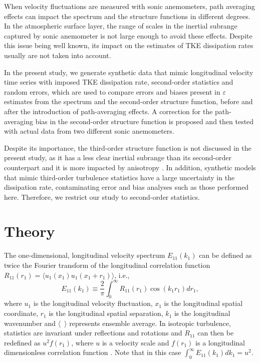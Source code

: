 \documentclass{svjour3}                     %
\begin{document}
When velocity fluctuations are measured with sonic anemometers, path
averaging effects can impact the spectrum and the structure functions
in different degrees. In the atmospheric surface layer, the range of
scales in the inertial subrange captured by sonic anemometer is not
large enough to avoid these effects.  Despite this issue being well
known, its impact on the estimates of TKE dissipation rates usually
are not taken into account.

In the present study, we generate synthetic data that mimic
longitudinal velocity time series with imposed TKE dissipation rate,
second-order statistics and random errors, which are used to compare
errors and biases present in $\varepsilon$ estimates from the spectrum
and the second-order structure function, before and after the
introduction of path-averaging effects. A correction for the
path-averaging bias in the second-order structure function is proposed
and then tested with actual data from two different sonic anemometers.

Despite its importance, the third-order structure function is not
discussed in the present study, as it has a less clear inertial
subrange than its second-order counterpart and it is more impacted by
anisotropy \citep{ChaDia2004}. In addition, synthetic models that
mimic third-order turbulence statistics have a large uncertainty in
the dissipation rate, contaminating error and bias analyses such as
those performed here. Therefore, we restrict our study to second-order
statistics.


\section{Theory}

The one-dimensional, longitudinal velocity spectrum $E_{11}(k_1)$ can
be defined as twice the Fourier transform of the longitudinal
correlation function $R_{11}(r_1) = \langle
u_1(x_1)u_1(x_1+r_1)\rangle$, i.e.,
\begin{equation}
  E_{11}(k_1) \equiv \frac{2}{\pi}\int_0^\infty R_{11}(r_1) \cos(k_1r_1) dr_1,
\end{equation}
 where $u_1$ is the longitudinal velocity fluctuation, $x_1$ is the
 longitudinal spatial coordinate, $r_1$ is the longitudinal spatial
 separation, $k_1$ is the longitudinal wavenumber and $\langle \,\,\,
 \rangle$ represents ensemble average. In isotropic turbulence, 
 statistics are invariant under reflections and rotations and $R_{11}$
 can then be redefined as $u^2 f(r_1)$, where $u$ is a velocity scale
 and $f(r_1)$ is a longitudinal dimensionless correlation function
 \citep[][p. 89]{Dav2004}. Note that in this case $\int_0^\infty
 E_{11}(k_1) dk_1 = u^2$.
\end{document}
